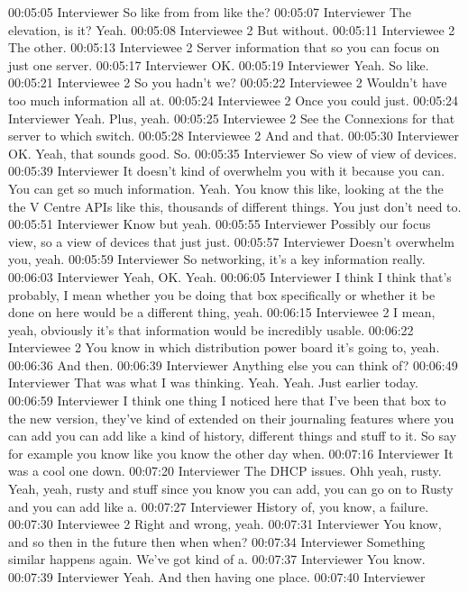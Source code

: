 00:05:05 Interviewer
So like from from like the?
00:05:07 Interviewer
The elevation, is it? Yeah.
00:05:08 Interviewee 2 
But without.
00:05:11 Interviewee 2 
The other.
00:05:13 Interviewee 2 
Server information that so you can focus on just one server.
00:05:17 Interviewer
OK.
00:05:19 Interviewer
Yeah. So like.
00:05:21 Interviewee 2 
So you hadn't we?
00:05:22 Interviewee 2 
Wouldn't have too much information all at.
00:05:24 Interviewee 2 
Once you could just.
00:05:24 Interviewer
Yeah. Plus, yeah.
00:05:25 Interviewee 2 
See the Connexions for that server to which switch.
00:05:28 Interviewee 2 
And and that.
00:05:30 Interviewer
OK. Yeah, that sounds good. So.
00:05:35 Interviewer
So view of view of devices.
00:05:39 Interviewer
It doesn't kind of overwhelm you with it because you can. You can get so much information. Yeah. You know this like, looking at the the the V Centre APIs like this, thousands of different things. You just don't need to.
00:05:51 Interviewer
Know but yeah.
00:05:55 Interviewer
Possibly our focus view, so a view of devices that just just.
00:05:57 Interviewer
Doesn't overwhelm you, yeah.
00:05:59 Interviewer
So networking, it's a key information really.
00:06:03 Interviewer
Yeah, OK. Yeah.
00:06:05 Interviewer
I think I think that's probably, I mean whether you be doing that box specifically or whether it be done on here would be a different thing, yeah.
00:06:15 Interviewee 2 
I mean, yeah, obviously it's that information would be incredibly usable.
00:06:22 Interviewee 2 
You know in which distribution power board it's going to, yeah.
00:06:36
And then.
00:06:39 Interviewer
Anything else you can think of?
00:06:49 Interviewer
That was what I was thinking. Yeah. Yeah. Just earlier today.
00:06:59 Interviewer
I think one thing I noticed here that I've been that box to the new version, they've kind of extended on their journaling features where you can add you can add like a kind of history, different things and stuff to it. So say for example you know like you know the other day when.
00:07:16 Interviewer
It was a cool one down.
00:07:20 Interviewer
The DHCP issues. Ohh yeah, rusty. Yeah, yeah, rusty and stuff since you know you can add, you can go on to Rusty and you can add like a.
00:07:27 Interviewer
History of, you know, a failure.
00:07:30 Interviewee 2 
Right and wrong, yeah.
00:07:31 Interviewer
You know, and so then in the future then when when?
00:07:34 Interviewer
Something similar happens again. We've got kind of a.
00:07:37 Interviewer
You know.
00:07:39 Interviewer
Yeah. And then having one place.
00:07:40 Interviewer
